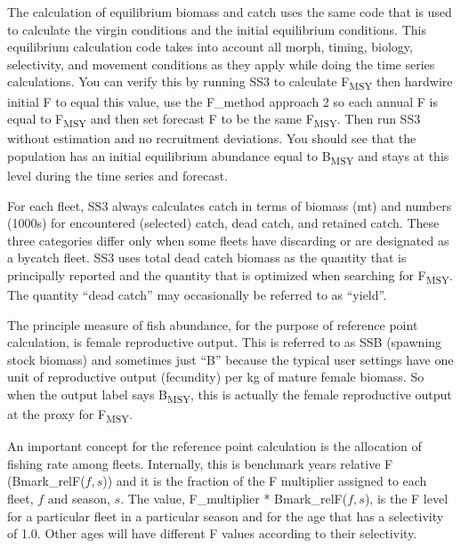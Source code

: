 The calculation of equilibrium biomass and catch uses the same code that is used to calculate the virgin conditions and the initial equilibrium conditions. This equilibrium calculation code takes into account all morph, timing, biology, selectivity, and movement conditions as they apply while doing the time series calculations. You can verify this by running SS3 to calculate F\textsubscript{MSY} then hardwire initial F to equal this value, use the F\_method approach 2 so each annual F is equal to F\textsubscript{MSY} and then set forecast F to be the same F\textsubscript{MSY}. Then run SS3 without estimation and no recruitment deviations. You should see that the population has an initial equilibrium abundance equal to B\textsubscript{MSY} and stays at this level during the time series and forecast.

\pagebreak
{}
For each fleet, SS3 always calculates catch in terms of biomass (mt) and numbers (1000s) for encountered (selected) catch, dead catch, and retained catch. These three categories differ only when some fleets have discarding or are designated as a bycatch fleet. SS3 uses total dead catch biomass as the quantity that is principally reported and the quantity that is optimized when searching for F\textsubscript{MSY}. The quantity ``dead catch'' may occasionally be referred to as ``yield''.

The principle measure of fish abundance, for the purpose of reference point calculation, is female reproductive output. This is referred to as SSB (spawning stock biomass) and sometimes just ``B'' because the typical user settings have one unit of reproductive output (fecundity) per kg of mature female biomass. So when the output label says B\textsubscript{MSY}, this is actually the female reproductive output at the proxy for F\textsubscript{MSY}.

An important concept for the reference point calculation is the allocation of fishing rate among fleets. Internally, this is benchmark years relative F (Bmark\_relF($f,s$)) and it is the fraction of the F multiplier assigned to each fleet, $f$ and season, $s$. The value, F\_multiplier * Bmark\_relF($f,s$), is the F level for a particular fleet in a particular season and for the age that has a selectivity of 1.0. Other ages will have different F values according to their selectivity.

